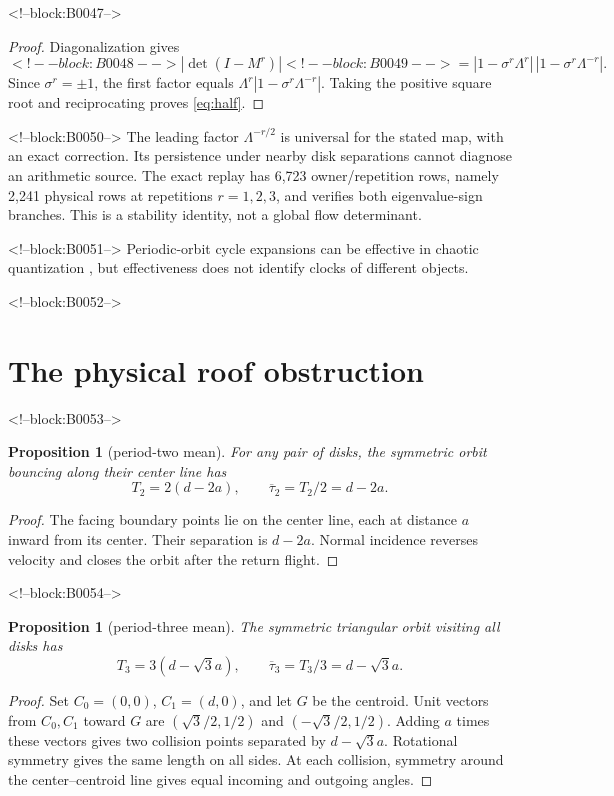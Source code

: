 \documentclass[11pt,a4paper]{article}
\newtheorem{proposition}[theorem]{Proposition}
\theoremstyle{definition}
\theoremstyle{remark}
\begin{document}
<!--block:B0047-->
\begin{proof}
Diagonalization gives
\[
<!--block:B0048-->
 |\det(I-M^r)|
<!--block:B0049-->
 =|1-\sigma^r\Lambda^r|\,|1-\sigma^r\Lambda^{-r}|.
\]
Since \(\sigma^r=\pm1\), the first factor equals
\(\Lambda^r|1-\sigma^r\Lambda^{-r}|\). Taking the positive square root and reciprocating proves \cref{eq:half}.
\end{proof}

<!--block:B0050-->
The leading factor \(\Lambda^{-r/2}\) is universal for the stated map, with an exact correction. Its persistence under nearby disk separations cannot diagnose an arithmetic source. The exact replay has 6,723 owner/repetition rows, namely 2,241 physical rows at repetitions \(r=1,2,3\), and verifies both eigenvalue-sign branches. This is a stability identity, not a global flow determinant.

<!--block:B0051-->
Periodic-orbit cycle expansions can be effective in chaotic quantization \citep[pp.~823--826]{CvitanovicEckhardt1989}, but effectiveness does not identify clocks of different objects.

<!--block:B0052-->
\section{The physical roof obstruction}

<!--block:B0053-->
\begin{proposition}[period-two mean]\label{prop:t2}
For any pair of disks, the symmetric orbit bouncing along their center line has
\[
 T_2=2(d-2a),\qquad \overline{\tau}_2=T_2/2=d-2a.
\]
\end{proposition}
\begin{proof}
The facing boundary points lie on the center line, each at distance \(a\) inward from its center. Their separation is \(d-2a\). Normal incidence reverses velocity and closes the orbit after the return flight.
\end{proof}

<!--block:B0054-->
\begin{proposition}[period-three mean]\label{prop:t3}
The symmetric triangular orbit visiting all disks has
\[
 T_3=3(d-\sqrt3a),\qquad \overline{\tau}_3=T_3/3=d-\sqrt3a.
\]
\end{proposition}
\begin{proof}
Set \(C_0=(0,0)\), \(C_1=(d,0)\), and let \(G\) be the centroid. Unit vectors from \(C_0,C_1\) toward \(G\) are
\((\sqrt3/2,1/2)\) and \((-\sqrt3/2,1/2)\). Adding \(a\) times these vectors gives two collision points separated by \(d-\sqrt3a\). Rotational symmetry gives the same length on all sides. At each collision, symmetry around the center--centroid line gives equal incoming and outgoing angles.
\end{proof}
\end{document}
